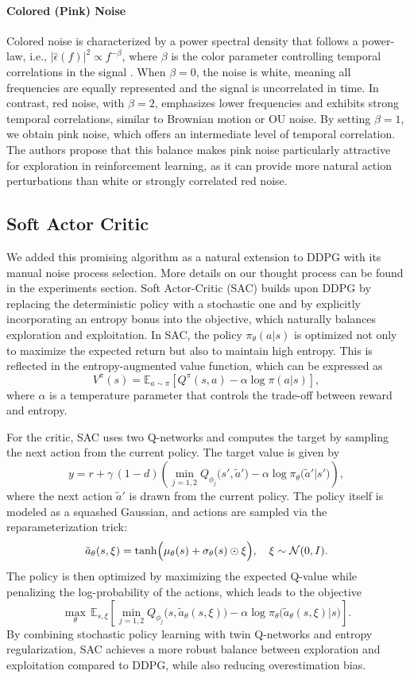 \paragraph{Colored (Pink) Noise}
Colored noise is characterized by a power spectral density that follows a power-law, i.e., 
\( |\hat{\epsilon}(f)|^2 \propto f^{-\beta} \),
where \(\beta\) is the color parameter controlling temporal correlations in the signal \cite{eberhard2023pink}. When \(\beta = 0\), the noise is white, meaning all frequencies are equally represented and the signal is uncorrelated in time. In contrast, red noise, with \(\beta = 2\), emphasizes lower frequencies and exhibits strong temporal correlations, similar to Brownian motion or OU noise. By setting \(\beta = 1\), we obtain pink noise, which offers an intermediate level of temporal correlation. The authors propose that this balance makes pink noise particularly attractive for exploration in reinforcement learning, as it can provide more natural action perturbations than white or strongly correlated red noise. 

\subsection{Soft Actor Critic}
We added this promising algorithm as a natural extension to DDPG with its manual noise process selection. More details on our thought process can be found in the experiments section. Soft Actor-Critic (SAC) builds upon DDPG by replacing the deterministic policy with a stochastic one and by explicitly incorporating an entropy bonus into the objective, which naturally balances exploration and exploitation\cite{HaarnojaAbbeelLevine2018:SAC}. In SAC, the policy \(\pi_\theta(a|s)\) is optimized not only to maximize the expected return but also to maintain high entropy. This is reflected in the entropy-augmented value function, which can be expressed as
\[
V^{\pi}(s) = \mathbb{E}_{a\sim\pi}\!\left[Q^{\pi}(s,a)-\alpha\log\pi(a|s)\right],
\]
where \(\alpha\) is a temperature parameter that controls the trade-off between reward and entropy.

For the critic, SAC uses two Q-networks and computes the target by sampling the next action from the current policy. The target value is given by
\[
y = r + \gamma\,(1-d)\left(\min_{j=1,2}Q_{\phi_j}\bigl(s',\tilde{a}'\bigr)-\alpha\log\pi_\theta\bigl(\tilde{a}'|s'\bigr)\right),
\]
where the next action \(\tilde{a}'\) is drawn from the current policy. The policy itself is modeled as a squashed Gaussian, and actions are sampled via the reparameterization trick:
\[
\tilde{a}_\theta(s,\xi)=\tanh\Bigl(\mu_\theta(s)+\sigma_\theta(s)\odot\xi\Bigr),\quad \xi\sim\mathcal{N}(0,I).
\]
The policy is then optimized by maximizing the expected Q-value while penalizing the log-probability of the actions, which leads to the objective
\[
\max_\theta\,\mathbb{E}_{s,\xi}\!\left[\min_{j=1,2}Q_{\phi_j}\bigl(s,\tilde{a}_\theta(s,\xi)\bigr)-\alpha\log\pi_\theta\bigl(\tilde{a}_\theta(s,\xi)|s\bigr)\right].
\]
By combining stochastic policy learning with twin Q-networks and entropy regularization, SAC achieves a more robust balance between exploration and exploitation compared to DDPG, while also reducing overestimation bias.

